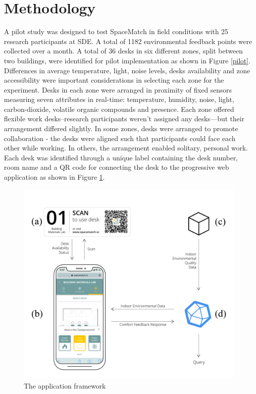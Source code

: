 \documentclass[]{interact}
\theoremstyle{plain}%
\theoremstyle{definition}
\theoremstyle{remark}
\begin{document}
\section{Methodology}


A pilot study was designed to test SpaceMatch in field conditions with 25 research participants at SDE. A total of 1182 environmental feedback points were collected over a month. A total of 36 desks in six different zones, split between two buildings, were identified for pilot implementation as shown in Figure \ref{pilot}. Differences in average temperature, light, noise levels, desks availability and zone accessibility were important considerations in selecting each zone for the experiment. Desks in each zone were arranged in proximity of fixed sensors measuring seven attributes in real-time: temperature, humidity, noise, light, carbon-dioxide, volatile organic compounds and presence. Each zone offered flexible work desks--research participants weren't assigned any desks---but their arrangement differed slightly. In some zones, desks were arranged to promote collaboration - the desks were aligned such that participants could face each other while working. In others, the arrangement enabled solitary, personal work. Each desk was identified through a unique label containing the desk number, room name and a QR code for connecting the desk to the progressive web application as shown in Figure \ref{framework}.

\begin{figure}
\centering
\includegraphics[scale=0.1]{figures/framework.jpg}
\caption{The application framework} 
\label{framework}
\end{figure}
\end{document}
